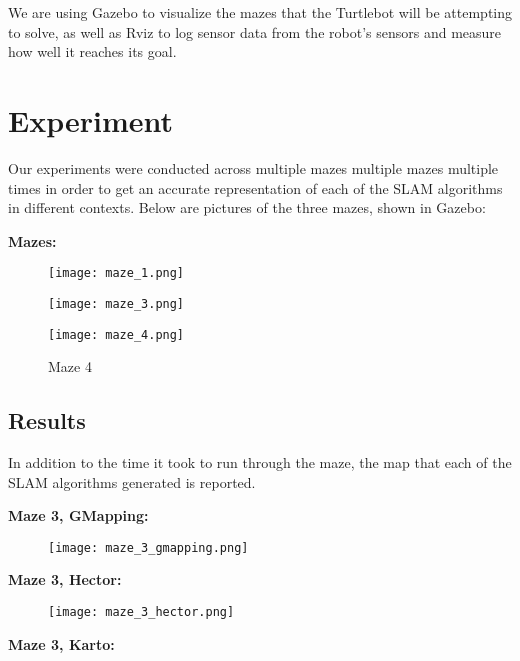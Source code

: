 \documentclass{article}
\begin{document}
We are using Gazebo to visualize the mazes that the Turtlebot will be attempting to solve, as well as Rviz to log sensor data from the robot's sensors and measure how well it reaches its goal. 

\section{Experiment}

Our experiments were conducted across multiple mazes multiple mazes multiple times in order to get an accurate representation of each of the SLAM algorithms in different contexts. Below are pictures of the three mazes, shown in Gazebo:

{\bf Mazes:}
\begin{figure}[htbp]
    \centering
    \begin{minipage}{0.3\textwidth}
        \centering
        \texttt{[image: maze\_1.png]} 
        \caption{Maze 1}
    \end{minipage}%
    \hfill
    \begin{minipage}{0.3\textwidth}
        \centering
        \texttt{[image: maze\_3.png]}
        \caption{Maze 3}
    \end{minipage}%
    \hfill
    \begin{minipage}{0.3\textwidth}
        \centering
        \texttt{[image: maze\_4.png]}
        \caption{Maze 4}
    \end{minipage}
\end{figure}

\subsection{Results}

In addition to the time it took to run through the maze, the map that each of the SLAM algorithms generated is reported. 

{\bf Maze 3, GMapping:}

\begin{figure}[htbp]
    \centering
    \texttt{[image: maze\_3\_gmapping.png]} 
\end{figure}
\pagebreak
{\bf Maze 3, Hector:}

\begin{figure}[htbp]
    \centering
    \texttt{[image: maze\_3\_hector.png]} 
\end{figure}

{\bf Maze 3, Karto:}
\end{document}
